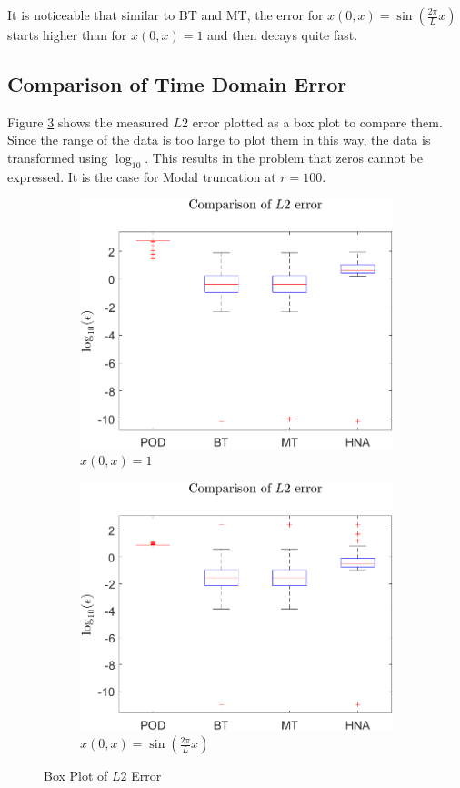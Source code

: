 It is noticeable that similar to BT and MT, the error for \(x(0, x) = \sin(\frac{2\pi}{L}x)\) starts higher than for \(x(0, x) = 1\) and then decays quite fast.

\subsection{Comparison of Time Domain Error}
Figure \ref{FIG-BOX-L2} shows the measured \(L2\) error plotted as a box plot to compare them. 
Since the range of the data is too large to plot them in this way, the data is transformed using \(\log_{10}\).
This results in the problem that zeros cannot be expressed.
It is the case for Modal truncation at \(r = 100\).
\begin{figure}[H]
\begin{subfigure}[b]{0.5\textwidth}
\centering
\includegraphics[width=\textwidth]{images/L2_BOX}
\caption{$x(0, x) = 1$}
\label{FIG-BOX}
\end{subfigure}
\begin{subfigure}[b]{0.5\textwidth}
\centering
\includegraphics[width=\textwidth]{images/L2_BOX_SIN}
\caption{$x(0, x) = \sin(\frac{2\pi}{L}x)$}
\label{FIG-BOX-SIN}
\end{subfigure}
\caption{Box Plot of \(L2\) Error}
\label{FIG-BOX-L2}
\end{figure}
